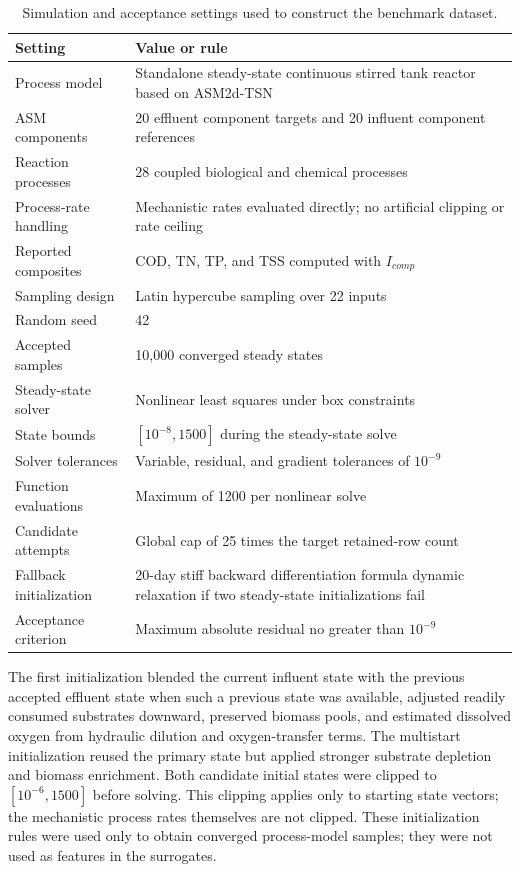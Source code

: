 \documentclass[a4paper,fleqn]{cas-sc}
\newcommand{\csvcomma}{,}
\begin{document}
\begin{table}[htbp]
\centering
\caption{Simulation and acceptance settings used to construct the benchmark dataset.}
\label{tab:simulation_settings}
\scriptsize
\begin{tabular}{p{3.7cm}p{7.2cm}}
\hline
Setting & Value or rule \\
\hline
Process model & Standalone steady-state continuous stirred tank reactor based on ASM2d-TSN \\
ASM components & 20 effluent component targets and 20 influent component references \\
Reaction processes & 28 coupled biological and chemical processes \\
Process-rate handling & Mechanistic rates evaluated directly; no artificial clipping or rate ceiling \\
Reported composites & COD\csvcomma{} TN\csvcomma{} TP\csvcomma{} and TSS computed with $I_{comp}$ \\
Sampling design & Latin hypercube sampling over 22 inputs \\
Random seed & 42 \\
Accepted samples & 10\csvcomma{}000 converged steady states \\
Steady-state solver & Nonlinear least squares under box constraints \\
State bounds & $[10^{-8}\csvcomma{}1500]$ during the steady-state solve \\
Solver tolerances & Variable\csvcomma{} residual\csvcomma{} and gradient tolerances of $10^{-9}$ \\
Function evaluations & Maximum of 1200 per nonlinear solve \\
Candidate attempts & Global cap of 25 times the target retained-row count \\
Fallback initialization & 20-day stiff backward differentiation formula dynamic relaxation if two steady-state initializations fail \\
Acceptance criterion & Maximum absolute residual no greater than $10^{-9}$ \\
\hline
\end{tabular}
\end{table}

The first initialization blended the current influent state with the previous accepted effluent state when such a previous state was available, adjusted readily consumed substrates downward, preserved biomass pools, and estimated dissolved oxygen from hydraulic dilution and oxygen-transfer terms. The multistart initialization reused the primary state but applied stronger substrate depletion and biomass enrichment. Both candidate initial states were clipped to $[10^{-6},1500]$ before solving. This clipping applies only to starting state vectors; the mechanistic process rates themselves are not clipped. These initialization rules were used only to obtain converged process-model samples; they were not used as features in the surrogates.
\end{document}
